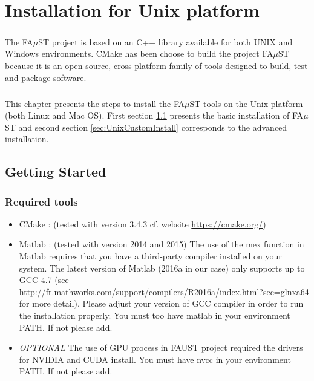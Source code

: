 \chapter{Installation for Unix platform}\label{sec:InstallUnix}

\paragraph{}The FA$\mu$ST project is based on an C++ library available for both UNIX and Windows environments. CMake has been choose to build the project FA$\mu$ST because it is an open-source, cross-platform family of tools designed to build, test and package software.

\paragraph{}This chapter presents the steps to install the FA$\mu$ST tools on the Unix platform (both Linux and Mac OS). First section \ref{sec:UnixGettingStarted} presents the basic installation of FA$\mu$ST and second section \ref{sec:UnixCustomInstall} corresponds to the advanced  installation.

\section{Getting Started}\label{sec:UnixGettingStarted}

\subsection{Required tools}\label{sec:RequiredTools}

\begin{itemize}
\item CMake : (tested with version 3.4.3 cf. website \url{https://cmake.org/})
\item Matlab : (tested with version 2014 and 2015)
The use of the mex function in Matlab requires that you have a third-party compiler installed on your system. The latest version of Matlab (2016a in our case) only supports up to GCC 4.7 (see \url{http://fr.mathworks.com/support/compilers/R2016a/index.html?sec=glnxa64} for more detail). Please adjust your version of GCC compiler in order to run the installation properly. 
You must too have matlab in your environment PATH. If not please add. 

\item \textit{OPTIONAL} The use of GPU process in FAUST project required the drivers for NVIDIA and CUDA install. You must have nvcc in your environment PATH. If not please add.
\end{itemize}

